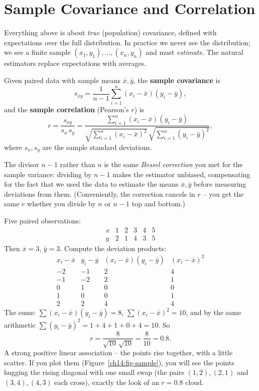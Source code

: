 \section{Sample Covariance and Correlation}
\label{ch14:sample}

Everything above is about \emph{true} (population) covariance, defined with
expectations over the full distribution. In practice we never see the distribution;
we see a finite sample $(x_1, y_1), \dots, (x_n, y_n)$ and must \emph{estimate}.
The natural estimators replace expectations with averages.

\begin{definition}
\label{ch14:def-sample}
Given paired data with sample means $\bar x, \bar y$, the \textbf{sample covariance}
is
\[
s_{xy} = \frac{1}{n-1} \sum_{i=1}^n (x_i - \bar x)(y_i - \bar y),
\]
and the \textbf{sample correlation} (Pearson's $r$) is
\[
r = \frac{s_{xy}}{s_x\, s_y}
= \frac{\sum_{i=1}^n (x_i - \bar x)(y_i - \bar y)}
       {\sqrt{\sum_{i=1}^n (x_i - \bar x)^2}\,
        \sqrt{\sum_{i=1}^n (y_i - \bar y)^2}},
\]
where $s_x, s_y$ are the sample standard deviations.
\end{definition}

The divisor $n - 1$ rather than $n$ is the same \emph{Bessel correction} you met for
the sample variance: dividing by $n-1$ makes the estimator unbiased, compensating
for the fact that we used the data to estimate the means $\bar x, \bar y$ before
measuring deviations from them. (Conveniently, the correction cancels in $r$ -- you
get the same $r$ whether you divide by $n$ or $n - 1$ top and bottom.)

\begin{example}
\label{ch14:ex-sample}
Five paired observations:
\[
\begin{array}{c|ccccc}
x & 1 & 2 & 3 & 4 & 5 \\ \hline
y & 2 & 1 & 4 & 3 & 5
\end{array}
\]
Then $\bar x = 3$, $\bar y = 3$. Compute the deviation products:
\[
\begin{array}{c|c|c|c}
x_i - \bar x & y_i - \bar y & (x_i-\bar x)(y_i-\bar y) & (x_i-\bar x)^2 \\ \hline
-2 & -1 & 2 & 4 \\
-1 & -2 & 2 & 1 \\
 0 &  1 & 0 & 0 \\
 1 &  0 & 0 & 1 \\
 2 &  2 & 4 & 4
\end{array}
\]
The sums: $\sum (x_i-\bar x)(y_i-\bar y) = 8$, $\sum(x_i-\bar x)^2 = 10$, and by the
same arithmetic $\sum (y_i - \bar y)^2 = 1 + 4 + 1 + 0 + 4 = 10$. So
\[
r = \frac{8}{\sqrt{10}\,\sqrt{10}} = \frac{8}{10} = 0.8.
\]
A strong positive linear association -- the points rise together, with a little
scatter. If you plot them (Figure~\ref{ch14:fig-sample}), you will see the points
hugging the rising diagonal with one small swap (the pairs $(1,2),(2,1)$ and
$(3,4),(4,3)$ each cross), exactly the look of an $r = 0.8$ cloud.
\end{example}

